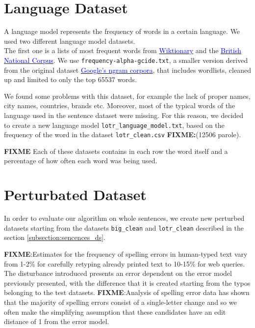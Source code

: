 \section{Language Dataset}
A language model represents the frequency of words in a certain language.
We used two different language model datasets. \\
The first one is a lists of most frequent words from 
\href{https://en.wiktionary.org/wiki/Wiktionary:Frequency_lists}{ 
	\textcolor{blue}{Wiktionary}} and the 
	\href{http://www.kilgarriff.co.uk/bnc-readme.html}{\textcolor{blue}{British National Corpus}}. 
We use \texttt{frequency-alpha-gcide.txt}, a smaller version derived from the original dataset 
\href{https://books.google.com/ngrams/}{\textcolor{blue}{Google's ngram corpora}}, that includes wordlists, 
cleaned up and limited to only the top \num{65537} words.

We found some problems with this dataset, for example the lack of proper names, city names, countries, brands 
etc.
Moreover, most of the typical words of the language used in the sentence dataset were missing.
For this reason, we decided to create a new language model \texttt{lotr\_language\_model.txt}, based on the 
frequency of the word in the dataset \texttt{lotr\_clean.csv} \textbf{FIXME:}(12506 parole).

\textbf{FIXME}{
	Each of these datasets contains in each row the word itself and a percentage of how often each word was 
	being used.}

\section{Perturbated Dataset}
\label{subsection:perturbed}
In order to evaluate our algorithm on whole sentences, we create new perturbed datasets starting from the 
datasets \texttt{big\_clean} and \texttt{lotr\_clean} described in the section \ref{subsection:sencences_ds}.

\textbf{FIXME}:Estimates for the frequency of spelling errors in human-typed text vary from 1-2\% for carefully 
retyping already printed text to 10-15\% for web queries.
The disturbance introduced presents an error dependent on the error model previously presented, with the 
difference that it is created starting from the typos belonging to the test datasets.
\textbf{FIXME}:{Analysis of spelling error data has shown that the majority of spelling errors consist of a 
single-letter change and so we often make the simplifying assumption that these candidates have an edit 
distance of 1 from the error model.}

